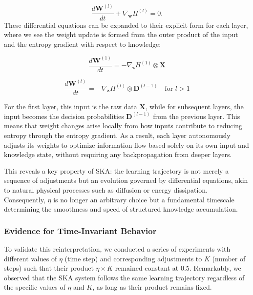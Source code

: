 \documentclass{article}
\begin{document}
	\begin{equation}
		\frac{d\mathbf{W}^{(l)}}{dt} + \nabla_{\mathbf{w}} H^{(l)} = 0.
	\end{equation}
These differential equations can be expanded to their explicit form for each layer, where we see the weight update is formed from the outer product of the input and the entropy gradient with respect to knowledge:
	
	\begin{equation}
		\frac{d\mathbf{W}^{(1)}}{dt} = -\nabla_{\mathbf{z}} H^{(1)} \otimes  \mathbf{X} 
	\end{equation}
	
	\begin{equation}
		\frac{d\mathbf{W}^{(l)}}{dt} = -\nabla_{\mathbf{z}} H^{(l)} \otimes  \mathbf{D}^{(l-1)}   \quad \text{for } l > 1
	\end{equation}
	
For the first layer, this input is the raw data  $\mathbf{X}$, while for subsequent layers, the input becomes the decision probabilities $\mathbf{D}^{(l-1)}$ from the previous layer. This means that weight changes arise locally from how inputs contribute to reducing entropy through the entropy gradient. As a result, each layer autonomously adjusts its weights to optimize information flow based solely on its own input and knowledge state, without requiring any backpropagation from deeper layers.
	
	This reveals a key property of SKA: the learning trajectory is not merely a sequence of adjustments but an evolution governed by differential equations, akin to natural physical processes such as diffusion or energy dissipation. Consequently, \( \eta \) is no longer an arbitrary choice but a fundamental timescale determining the smoothness and speed of structured knowledge accumulation.
	
	
	\subsubsection{Evidence for Time-Invariant Behavior}
	
	To validate this reinterpretation, we conducted a series of experiments with different values of $\eta$ (time step) and corresponding adjustments to $K$ (number of steps) such that their product $\eta \times K$ remained constant at 0.5. Remarkably, we observed that the SKA system follows the same learning trajectory regardless of the specific values of $\eta$ and $K$, as long as their product remains fixed.
	
\end{document}
